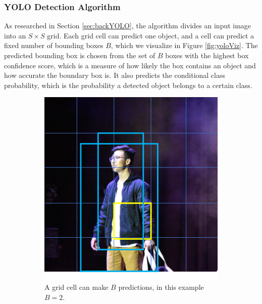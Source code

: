 \subsubsection{YOLO Detection Algorithm}
As researched in Section \ref{sec:backYOLO}, the algorithm divides an input image into an $S\times S$ grid. Each grid cell can predict one object, and a cell can predict a fixed number of bounding boxes $B$, which we visualize in Figure \ref{fig:yoloViz}. The predicted bounding box is chosen from the set of $B$ boxes with the highest box confidence score, which is a measure of how likely the box contains an object and how accurate the boundary box is. It also predicts the conditional class probability, which is the probability a detected object belongs to a certain class. 

\begin{figure}[ht]
	\begin{subfigure}[b]{.45\textwidth}
		\centering
		\includegraphics[width=1.0\linewidth]{img/chapter5_implementation/yoloAlgo1.png}
		\caption{A grid cell can make $B$ predictions, in this example $B=2$.}
	\end{subfigure}%
	\hspace{\fill} 
	\begin{subfigure}[b]{.45\textwidth}
		\centering

\end{subfigure}
\end{figure}
